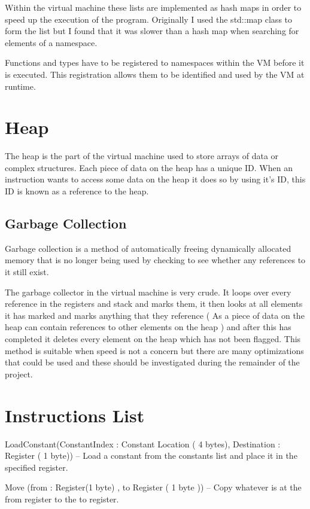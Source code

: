 \documentclass[]{final_report}
\begin{document}
Within the virtual machine these lists are implemented as hash maps in order to speed up the execution of the program. Originally I used the std::map class to form the list but I found that it was slower than a hash map when searching for elements of a namespace.

Functions and types have to be registered to namespaces within the VM before it is executed. This registration allows them to be identified and used by the VM at runtime.

\section{Heap}

The heap is the part of the virtual machine used to store arrays of data or complex structures. Each piece of data on the heap has a unique ID. When an instruction wants to access some data on the heap it does so by using it's ID, this ID is known as a reference to the heap.

\subsection{Garbage Collection}

Garbage collection is a method of automatically freeing dynamically allocated memory that is no longer being used by checking to see whether any references to it still exist.

The garbage collector in the virtual machine is very crude. It loops over every reference in the registers and stack and marks them, it then looks at all elements it has marked and marks anything that they reference ( As a piece of data on the heap can contain references to other elements on the heap ) and after this has completed it deletes every element on the heap which has not been flagged. This method is suitable when speed is not a concern but there are many optimizations that could be used and these should be investigated during the remainder of the project.

\section{Instructions List}

LoadConstant(ConstantIndex : Constant Location ( 4 bytes), Destination : Register ( 1 byte)) – Load a constant from the constants list and place it in the specified register.

Move (from : Register(1 byte) , to Register ( 1 byte )) – Copy whatever is at the from register to the
to register.
\end{document}
